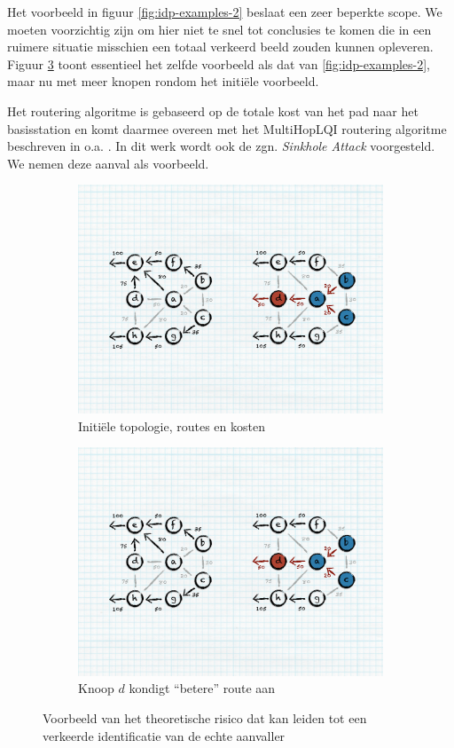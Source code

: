 Het voorbeeld in figuur \ref{fig:idp-examples-2} beslaat een zeer beperkte
scope. We moeten voorzichtig zijn om hier niet te snel tot conclusies te komen
die in een ruimere situatie misschien een totaal verkeerd beeld zouden kunnen
opleveren. Figuur \ref{fig:sinkhole-ripple} toont essentieel het zelfde
voorbeeld als dat van \ref{fig:idp-examples-2}, maar nu met meer knopen rondom
het initi\"ele voorbeeld.

Het routering algoritme is gebaseerd op de totale kost van het pad naar het
basisstation en komt daarmee overeen met het MultiHopLQI routering algoritme
beschreven in o.a. \citep{krontiris2008launching}. In dit werk wordt ook de zgn.
\emph{Sinkhole Attack} voorgesteld. We nemen deze aanval als voorbeeld.

\begin{figure}[ht]
\centering
\begin{subfigure}{.49\textwidth}
  \centering
  \includegraphics[width=.8\linewidth]{./resources/sinkhole-before.pdf}
  \caption{Initi\"ele topologie, routes en kosten}
  \label{fig:sinkhole-ripple-1}
\end{subfigure}
\begin{subfigure}{.49\textwidth}
  \centering
  \includegraphics[width=.8\linewidth]{./resources/sinkhole-after.pdf}
  \caption{Knoop $d$ kondigt ``betere'' route aan}
  \label{fig:sinkhole-ripple-2}
\end{subfigure}
\caption{Voorbeeld van het theoretische risico dat kan leiden tot een verkeerde
identificatie van de echte aanvaller}
\label{fig:sinkhole-ripple}
\end{figure}

